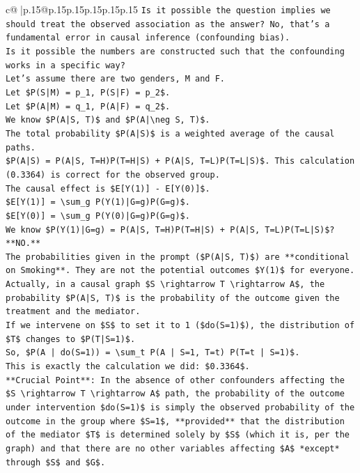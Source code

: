 \documentclass{article}
\begin{document}
{\begin{supertabular}{c@{$\;$}|p{.15\linewidth}@{}p{.15\linewidth}p{.15\linewidth}p{.15\linewidth}p{.15\linewidth}p{.15\linewidth}}
{{{\texttt{Is it possible the question implies we should treat the observed association as the answer? No, that's a fundamental error in causal inference (confounding bias).} \\
\texttt{Is it possible the numbers are constructed such that the confounding works in a specific way?} \\
\texttt{Let's assume there are two genders, M and F.} \\
\texttt{Let \$P(S|M) = p\_1, P(S|F) = p\_2\$.} \\
\texttt{Let \$P(A|M) = q\_1, P(A|F) = q\_2\$.} \\
\texttt{We know \$P(A|S, T)\$ and \$P(A|\textbackslash{}neg S, T)\$.} \\
\texttt{The total probability \$P(A|S)\$ is a weighted average of the causal paths.} \\
\texttt{\$P(A|S) = P(A|S, T=H)P(T=H|S) + P(A|S, T=L)P(T=L|S)\$. This calculation (0.3364) is correct for the observed group.} \\
\texttt{The causal effect is \$E{[}Y(1){]} {-} E{[}Y(0){]}\$.} \\
\texttt{\$E{[}Y(1){]} = \textbackslash{}sum\_g P(Y(1)|G=g)P(G=g)\$.} \\
\texttt{\$E{[}Y(0){]} = \textbackslash{}sum\_g P(Y(0)|G=g)P(G=g)\$.} \\
\texttt{We know \$P(Y(1)|G=g) = P(A|S, T=H)P(T=H|S) + P(A|S, T=L)P(T=L|S)\$? **NO.**} \\
\texttt{The probabilities given in the prompt (\$P(A|S, T)\$) are **conditional on Smoking**. They are not the potential outcomes \$Y(1)\$ for everyone.} \\
\texttt{Actually, in a causal graph \$S \textbackslash{}rightarrow T \textbackslash{}rightarrow A\$, the probability \$P(A|S, T)\$ is the probability of the outcome given the treatment and the mediator.} \\
\texttt{If we intervene on \$S\$ to set it to 1 (\$do(S=1)\$), the distribution of \$T\$ changes to \$P(T|S=1)\$.} \\
\texttt{So, \$P(A | do(S=1)) = \textbackslash{}sum\_t P(A | S=1, T=t) P(T=t | S=1)\$.} \\
\texttt{This is exactly the calculation we did: \$0.3364\$.} \\
\texttt{**Crucial Point**: In the absence of other confounders affecting the \$S \textbackslash{}rightarrow T \textbackslash{}rightarrow A\$ path, the probability of the outcome under intervention \$do(S=1)\$ is simply the observed probability of the outcome in the group where \$S=1\$, **provided** that the distribution of the mediator \$T\$ is determined solely by \$S\$ (which it is, per the graph) and that there are no other variables affecting \$A\$ *except* through \$S\$ and \$G\$.} \\
}}}
\end{supertabular}}
\end{document}

